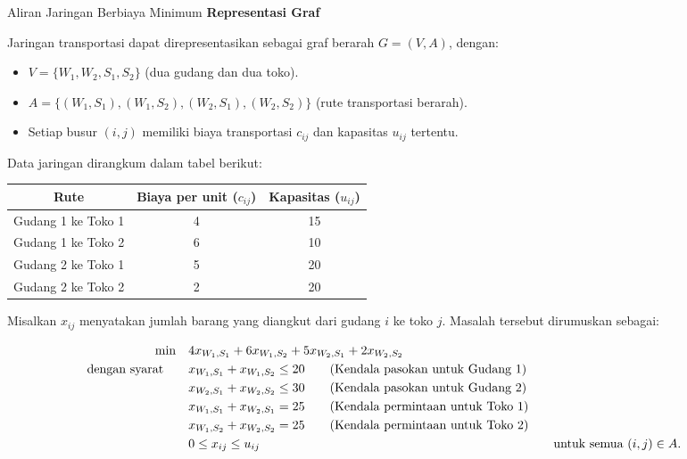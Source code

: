 \begin{examplewithallcode}{Aliran Jaringan Berbiaya Minimum}
\textbf{Representasi Graf}

Jaringan transportasi dapat direpresentasikan sebagai graf berarah \( G = (V, A) \), dengan:

\begin{itemize}
    \item \( V = \{ W_1, W_2, S_1, S_2 \} \) (dua gudang dan dua toko).
    \item \( A = \{(W_1, S_1), (W_1, S_2), (W_2, S_1), (W_2, S_2)\} \) (rute transportasi berarah).
    \item Setiap busur \( (i,j) \) memiliki biaya transportasi \( c_{ij} \) dan kapasitas \( u_{ij} \) tertentu.
\end{itemize}

Data jaringan dirangkum dalam tabel berikut:

    \begin{tabular}{|c|c|c|}
        \hline
        Rute & Biaya per unit ($c_{ij}$) & Kapasitas ($u_{ij}$) \\
        \hline
        Gudang 1 ke Toko 1 & 4 & 15 \\
        Gudang 1 ke Toko 2 & 6 & 10 \\
        Gudang 2 ke Toko 1 & 5 & 20 \\
        Gudang 2 ke Toko 2 & 2 & 20 \\
        \hline
    \end{tabular}
\par{}\label{tab:modeling-sums-continued-tab01}%



Misalkan \( x_{ij} \) menyatakan jumlah barang yang diangkut dari gudang \( i \) ke toko \( j \). Masalah tersebut dirumuskan sebagai:

\begin{align}
\min \quad & 4x_{W_1,S_1} + 6x_{W_1,S_2} + 5x_{W_2,S_1} + 2x_{W_2,S_2}\label{eq:example_objective} \\
    \mbox{dengan syarat}\quad \quad
    & x_{W_1,S_1} + x_{W_1,S_2} \leq 20   \tag{Kendala pasokan untuk Gudang 1}\label{eq:supply1} \\
    & x_{W_2,S_1} + x_{W_2,S_2} \leq 30   \tag{Kendala pasokan untuk Gudang 2}\label{eq:supply2} \\
    & x_{W_1,S_1} + x_{W_2,S_1} = 25   \tag{Kendala permintaan untuk Toko 1}\label{eq:demand1} \\
    & x_{W_1,S_2} + x_{W_2,S_2} = 25   \tag{Kendala permintaan untuk Toko 2}\label{eq:demand2} \\
    & 0 \leq x_{ij} \leq u_{ij} &&\quad \mbox{untuk semua } (i,j) \in A.\label{eq:capacity_constraint_example}
\end{align}


\end{examplewithallcode}
